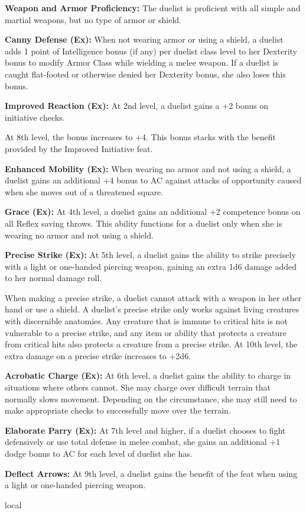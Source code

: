 {
\textbf{Weapon and Armor Proficiency:} The duelist is proficient with all simple and martial weapons, but no type of armor or shield.

\textbf{Canny Defense (Ex):} When not wearing armor or using a shield, a duelist adds 1 point of Intelligence bonus (if any) per duelist class level to her Dexterity bonus to modify Armor Class while wielding a melee weapon. If a duelist is caught flat-footed or otherwise denied her Dexterity bonus, she also loses this bonus.

\textbf{Improved Reaction (Ex):} At 2nd level, a duelist gains a +2 bonus on initiative checks.

At 8th level, the bonus increases to +4. This bonus stacks with the benefit provided by the Improved Initiative feat.

\textbf{Enhanced Mobility (Ex):} When wearing no armor and not using a shield, a duelist gains an additional +4 bonus to AC against attacks of opportunity caused when she moves out of a threatened square.

\textbf{Grace (Ex):} At 4th level, a duelist gains an additional +2 competence bonus on all Reflex saving throws. This ability functions for a duelist only when she is wearing no armor and not using a shield.

\textbf{Precise Strike (Ex):} At 5th level, a duelist gains the ability to strike precisely with a light or one-handed piercing weapon, gaining an extra 1d6 damage added to her normal damage roll.

When making a precise strike, a duelist cannot attack with a weapon in her other hand or use a shield. A duelist's precise strike only works against living creatures with discernible anatomies. Any creature that is immune to critical hits is not vulnerable to a precise strike, and any item or ability that protects a creature from critical hits also protects a creature from a precise strike. At 10th level, the extra damage on a precise strike increases to +2d6.

\textbf{Acrobatic Charge (Ex):} At 6th level, a duelist gains the ability to charge in situations where others cannot. She may charge over difficult terrain that normally slows movement. Depending on the circumstance, she may still need to make appropriate checks to successfully move over the terrain.

\textbf{Elaborate Parry (Ex):} At 7th level and higher, if a duelist chooses to fight defensively or use total defense in melee combat, she gains an additional +1 dodge bonus to AC for each level of duelist she has.

\textbf{Deflect Arrows:} At 9th level, a duelist gains the benefit of the  feat when using a light or one-handed piercing weapon.
}
{}
{local}
{}
{}
{}